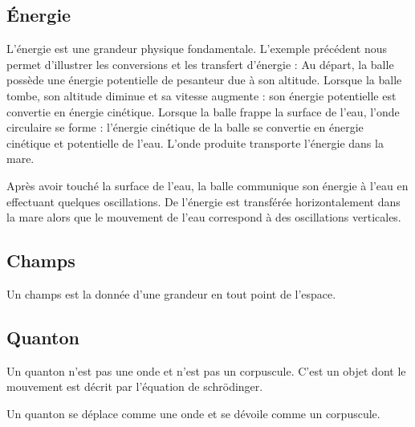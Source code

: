 \subsection{Énergie}

L'énergie est une grandeur physique fondamentale. L'exemple précédent nous permet d'illustrer les conversions et les transfert d'énergie : Au départ, la balle possède une énergie potentielle de pesanteur due à son altitude. Lorsque la balle tombe, son altitude diminue et sa vitesse augmente : son énergie potentielle est convertie en énergie cinétique.
Lorsque la balle frappe la surface de l'eau, l'onde circulaire se forme : l'énergie cinétique de la balle se convertie en énergie cinétique et potentielle de l'eau. L'onde produite transporte l'énergie dans la mare.

\vspace{0.5cm}
\begin{minipage}[c]{.45\linewidth}
Après avoir touché la surface de l'eau, la balle communique son énergie à l'eau en effectuant quelques oscillations.
De l'énergie est transférée horizontalement dans la mare alors que le mouvement de l'eau correspond à des oscillations verticales.
\end{minipage}
\hfill
\begin{minipage}[c]{.45\linewidth}

\end{minipage}






%
\subsection{Champs}

Un champs est la donnée d'une grandeur en tout point de l'espace.

\subsection{Quanton}
%
Un quanton n'est pas une onde et n'est pas un corpuscule. C'est un objet dont le mouvement est décrit par l'équation de schrödinger.

Un quanton se déplace comme une onde et se dévoile comme un corpuscule.

